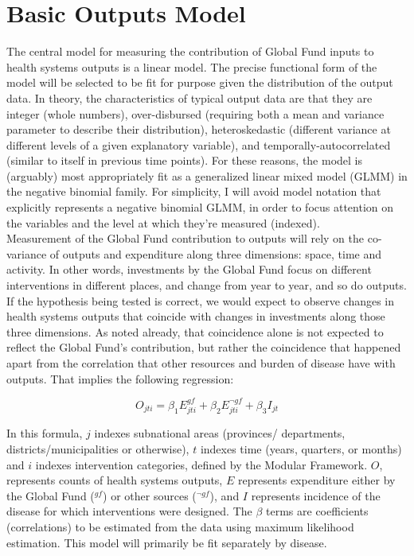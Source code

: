 \documentclass[twocolumn]{bmcart}%
\begin{document}

\section{Basic Outputs Model}

The central model for measuring the contribution of Global Fund inputs to health systems outputs is a linear model. The precise functional form of the model will be selected to be fit for purpose given the distribution of the output data. In theory, the characteristics of typical output data are that they are integer (whole numbers), over-disbursed (requiring both a mean and variance parameter to describe their distribution), heteroskedastic (different variance at different levels of a given explanatory variable), and temporally-autocorrelated (similar to itself in previous time points). For these reasons, the model is (arguably) most appropriately fit as a generalized linear mixed model (GLMM) in the negative binomial family. For simplicity, I will avoid model notation that explicitly represents a negative binomial GLMM, in order to focus attention on the variables and the level at which they're measured (indexed). \\

Measurement of the Global Fund contribution to outputs will rely on the co-variance of outputs and expenditure along three dimensions: space, time and activity. In other words, investments by the Global Fund focus on different interventions in different places, and change from year to year, and so do outputs. If the hypothesis being tested is correct, we would expect to observe changes in health systems outputs that coincide with changes in investments along those three dimensions. As noted already, that coincidence alone is not expected to reflect the Global Fund's contribution, but rather the coincidence that happened apart from the correlation that other resources and burden of disease have with outputs. That implies the following regression:

\begin{equation} \label{basic_model}
O_{jti} = \beta_1 E^{gf}_{jti} + \beta_2 E^{\neg gf}_{jti} + \beta_3 I_{jt}
\end{equation}

In this formula, $j$ indexes subnational areas (provinces/ departments, districts/municipalities or otherwise), $t$ indexes time (years, quarters, or months) and $i$ indexes intervention categories, defined by the Modular Framework. $O$, represents counts of health systems outputs, $E$ represents expenditure either by the Global Fund ($^{gf}$) or other sources ($^{\neg gf}$), and $I$ represents incidence of the disease for which interventions were designed. The $\beta$ terms are coefficients (correlations) to be estimated from the data using maximum likelihood estimation. This model will primarily be fit separately by disease.\\
\end{document}
